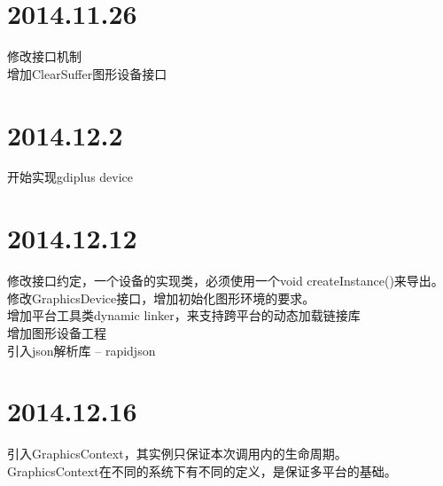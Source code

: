 \documentclass[12pt,a4paper]{report}
\begin{document}
\section*{2014.11.26}
修改接口机制\\
增加ClearSuffer图形设备接口\\

\section*{2014.12.2}
开始实现gdiplus device\\

\section*{2014.12.12}
修改接口约定，一个设备的实现类，必须使用一个void createInstance()来导出。\\
修改GraphicsDevice接口，增加初始化图形环境的要求。\\
增加平台工具类dynamic linker，来支持跨平台的动态加载链接库\\
增加图形设备工程\\
引入json解析库 -- rapidjson\\

\section*{2014.12.16}
引入GraphicsContext，其实例只保证本次调用内的生命周期。\\
GraphicsContext在不同的系统下有不同的定义，是保证多平台的基础。\\
\end{document}
